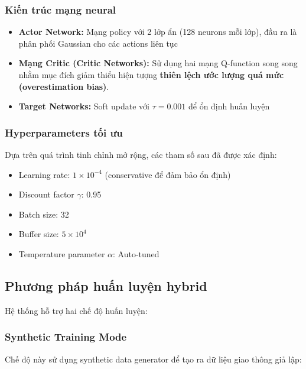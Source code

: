 \subsubsection{Kiến trúc mạng neural}
\begin{itemize}
    \item \textbf{Actor Network:} Mạng policy với 2 lớp ẩn (128 neurons mỗi lớp),
        đầu ra là phân phối Gaussian cho các actions liên tục

    \item \textbf{Mạng Critic (Critic Networks):} Sử dụng hai mạng Q-function song song nhằm mục đích giảm thiểu hiện tượng \textbf{thiên lệch ước lượng quá mức (overestimation bias)}.

    \item \textbf{Target Networks:} Soft update với $\tau = 0.001$ để ổn định
        huấn luyện
\end{itemize}

\subsubsection{Hyperparameters tối ưu}
Dựa trên quá trình tinh chỉnh mở rộng, các tham số sau đã được xác định:
\begin{itemize}
    \item Learning rate: $1 \times 10^{-4}$ (conservative để đảm bảo ổn định)
    \item Discount factor $\gamma$: 0.95
    \item Batch size: 32
    \item Buffer size: $5 \times 10^{4}$
    \item Temperature parameter $\alpha$: Auto-tuned
\end{itemize}

\subsection{Phương pháp huấn luyện hybrid}
Hệ thống hỗ trợ hai chế độ huấn luyện:

\subsubsection{Synthetic Training Mode}
Chế độ này sử dụng synthetic data generator để tạo ra dữ liệu giao thông giả lập:

